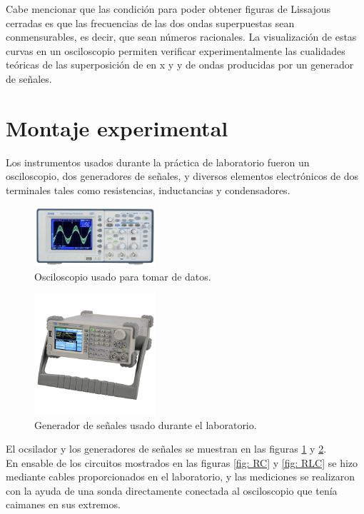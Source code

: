 \documentclass[prb,aps,twocolumn,preprintnumbers,amsmath,amssymb]{revtex4}
\begin{document}
Cabe mencionar que las condición para poder obtener figuras de Lissajous cerradas es que las frecuencias de las dos ondas superpuestas sean conmensurables, es decir, que sean números racionales. La visualización de estas curvas en un osciloscopio permiten verificar experimentalmente las cualidades teóricas de las superposición de en x y y de ondas producidas por un generador de señales.

\section{Montaje experimental}

Los instrumentos usados durante la práctica de laboratorio fueron un osciloscopio, dos generadores de señales, y diversos elementos electrónicos de dos terminales tales como resistencias, inductancias y condensadores.\\

\begin{figure}[h!]
	\centering
	\includegraphics[width=0.4\textwidth]{osci}
	\caption{Osciloscopio usado para tomar de datos.}
	\label{fig: osci}
\end{figure}

\begin{figure}[h!]
	\centering
	\includegraphics[width=0.4\textwidth,height=0.25\textheight]{generador}
	\caption{Generador de señales usado durante el laboratorio.}
	\label{fig: genr}
\end{figure}

El ocsilador y los generadores de señales se muestran en las figuras \ref{fig: osci} y \ref{fig: genr}.\\

En ensable de los circuitos mostrados en las figuras \ref{fig: RC} y \ref{fig: RLC} se hizo mediante cables proporcionados en el laboratorio, y las mediciones se realizaron con la ayuda de una sonda directamente conectada al osciloscopio que tenía caimanes en sus extremos.\\
\end{document}
